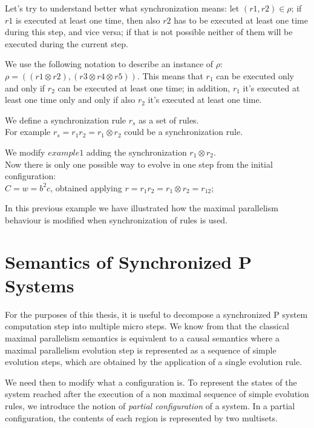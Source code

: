 Let's try to understand better what synchronization means:
let $(r1,r2) \in \rho$; if $r1$ is executed at least one time, then also
$r2$ has to be executed at least one time during this step, and vice versa; if that is not possible neither of them will be executed during the current step.

We use the following notation to describe an instance of $\rho$: 
$\rho=((r1 \otimes r2),(r3 \otimes r4 \otimes r5))$.
This means that $r_1$ can be executed only and only if $r_2$ can be executed at least one time;
in addition, $r_1$ it's executed at least one time only and only if also $r_2$ it's executed at least one time.

\begin{definition}
\label{def:sync_rule}
We define a synchronization rule $r_s$ as a set of rules.\\
For example $r_s=r_1 r_2 = r_1 \otimes r_2$ could be a synchronization rule.
\end{definition}

\begin{example}
    We modify \hyperref[ex:flat_membrane]{$example 1$} adding the synchronization 
    $r_1 \otimes r_2$.\\
    Now there is only one possible way to evolve in one step from the initial configuration:\\
    $C=w=b^2c$, obtained applying $r=r_1 r_2=r_1 \otimes r_2=r_{12}$;
\end{example}

In this previous example we have illustrated how the maximal parallelism behaviour is modified when synchronization of rules is used.

\section{Semantics of Synchronized P Systems}

For the purposes of this thesis, it is useful to decompose a synchronized P system computation step into multiple micro steps.
We know from \cite{busi2007causality} that the classical maximal parallelism semantics is equivalent to a causal semantics where a maximal parallelism evolution step is represented as a sequence of simple evolution steps, which are obtained by the application of a single evolution rule.

We need then to modify what a configuration is.
To represent the states of the system reached after the execution of a non maximal sequence of simple evolution rules, we introduce the notion of \textit{partial configuration} of a system.
In a partial configuration, the contents of each region is represented by two multisets.


